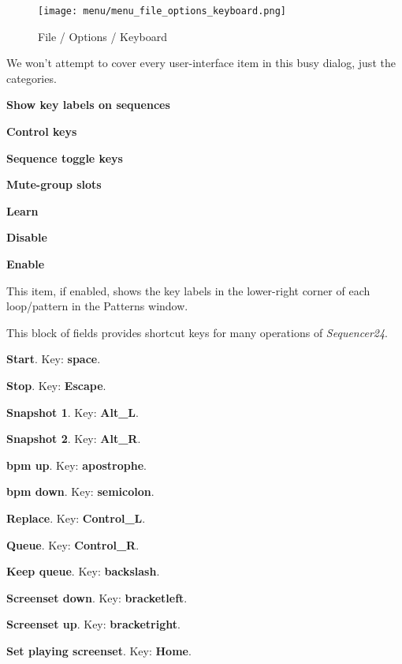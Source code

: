 \begin{figure}[H]
   \centering 
   \texttt{[image: menu/menu\_file\_options\_keyboard.png]}
   \caption{File / Options / Keyboard}
   \label{fig:seq24_menu_file_options_keyboard}
\end{figure}

   We won't attempt to cover every user-interface item in this busy
   dialog, just the categories.

   \begin{enumber}
      \item \textbf{Show key labels on sequences}
      \item \textbf{Control keys}
      \item \textbf{Sequence toggle keys}
      \item \textbf{Mute-group slots}
      \item \textbf{Learn}
      \item \textbf{Disable}
      \item \textbf{Enable}
   \end{enumber}

   \setcounter{ItemCounter}{0}      %

   This item, if enabled, shows the key labels in the lower-right corner of
   each loop/pattern in the Patterns window.

   This block of fields provides shortcut keys for many operations of
   \textsl{Sequencer24}.

   \begin{enumber}
      \item \textbf{Start}.
         Key:  \textbf{space}.
      \item \textbf{Stop}.
         Key:  \textbf{Escape}.
      \item \textbf{Snapshot 1}.
         Key:  \textbf{Alt\_L}.
      \item \textbf{Snapshot 2}.
         Key:  \textbf{Alt\_R}.
      \item \textbf{bpm up}.
         Key:  \textbf{apostrophe}.
      \item \textbf{bpm down}.
         Key:  \textbf{semicolon}.
      \item \textbf{Replace}.
         Key:  \textbf{Control\_L}.
      \item \textbf{Queue}.
         Key:  \textbf{Control\_R}.
      \item \textbf{Keep queue}.
         Key:  \textbf{backslash}.
      \item \textbf{Screenset down}.
         Key: \index{keys![} \textbf{bracketleft}.
      \item \textbf{Screenset up}.
         Key: \index{keys!]} \textbf{bracketright}.
      \item \textbf{Set playing screenset}.
         Key:  \textbf{Home}.
   \end{enumber}

